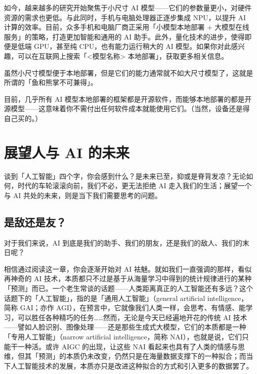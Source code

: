 如今，越来越多的研究开始聚焦于小尺寸 AI 模型——它们的参数量更小，对硬件资源的需求也更低。与此同时，手机与电脑处理器正逐步集成 NPU，以提升 AI 计算的效率。目前，众多手机和电脑厂商正采用「小模型本地部署 + 大模型在线服务」的策略，打造更加智能和通用的 AI 助手。此外，量化技术的进步，使得即便是低端 GPU，甚至纯 CPU，也有能力运行稍大的 AI 模型。如果你对此感兴趣，可以在互联网上搜索\clearglue{}「<模型名称> 本地部署」\restoreglue{}，获取更多相关信息。

\begin{note}
  虽然小尺寸模型便于本地部署，但是它们的能力通常就不如大尺寸模型了，这就是所谓的「鱼和熊掌不可兼得」。
\end{note}

\begin{dangerbox}
  目前，几乎所有 AI 模型本地部署的框架都是开源软件，而能够本地部署的都是开源模型——这意味着你不需付出任何软件成本就能使用它们。（当然，设备还是得自己买的。）
\end{dangerbox}

\section{展望人与 AI 的未来}

谈到「人工智能」四个字，你会感到什么？是未来已至，抑或是脊背发凉？无论如何，时代的车轮滚滚向前，我们不必，更无法拒绝 AI 走入我们的生活；展望一个与 AI 共处的未来，则是当下我们需要思考的问题。

\subsection{是敌还是友？}

对于我们来说，AI 到底是我们的助手、我们的朋友，还是我们的敌人、我们的末日呢？

相信通过阅读这一章，你会逐渐开始对 AI 袪魅。就如我们一直强调的那样，看似再神奇的 AI 技术，本质都只不过是基于从海量学习中得到的统计规律进行的某种「预测」而已。一个老生常谈的话题——人类距离真正的人工智能还有多远？这个话题下的「人工智能」，指的是「通用人工智能」（general artificial intelligence，简称 GAI；亦作 AGI），在预言中，它就像我们人类一样，会思考、有情感、能学习，可以胜任各种精巧的任务……然而，无论是今天已经遍地开花的传统 AI 技术——譬如人脸识别、图像处理——还是那些生成式大模型，它们的本质都是一种「专用人工智能」（narrow artificial intelligence，简称 NAI），也就是说，它们只能干一种活。或许 AIGC 的出现，让这些 NAI 看起来也具有了人类的情感与思维，但其「预测」的本质仍未改变，仍然只是在海量数据支撑下的一种拟合；而当下人工智能技术的发展，本质亦只是改进这种拟合的方式和引入更多的数据罢了。

